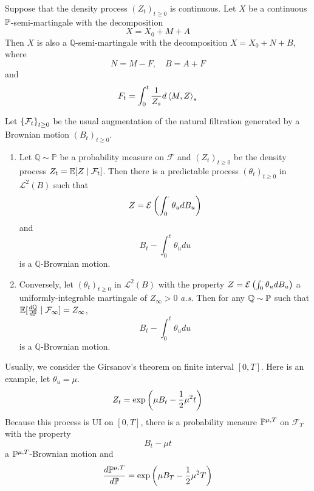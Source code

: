 \documentclass[a4paper,12pt]{article}
\begin{document}
\begin{prop}
  Suppose that the density process $(Z_t)_{t \geq 0}$ is continuous. Let $X$ be a continuous $\mathbb{P}$-semi-martingale with the decomposition
  \begin{equation*}
    X = X_0 + M + A
  \end{equation*}
  Then $X$ is also a $\mathbb{Q}$-semi-martingale with the decomposition $X = X_0 + N +B$, where
  \begin{equation*}
    N = M - F,\quad B = A+F
  \end{equation*}
  and 
  \begin{equation*}
    F_t = \int_0^t \frac{1}{Z_s}d \left\langle M,Z \right\rangle_s
  \end{equation*}
\end{prop}

\begin{thm}[Girsanov]
  Let $\left\{\mathcal{F}_t\right\}_{t \geq 0}$ be the usual augmentation of the natural filtration generated by a Brownian motion $(B_t)_{t \geq 0}$.
  \begin{enumerate}[label = \Roman*.]
    \item Let $\mathbb{Q} \sim \mathbb{P}$ be a probability measure on $\mathcal{F}$ and $(Z_t)_{t \geq 0}$ be the density process $Z_t = \mathbb{E}[Z \mid \mathcal{F}_t]$. Then there is a predictable process $(\theta_t)_{t \geq 0}$ in $\mathcal{L}^2(B)$ such that
    \begin{equation*}
      Z = \mathcal{E}\left(\int_0^{\cdot}\theta_u dB_u\right)
    \end{equation*}
    and
    \begin{equation*}
      B_t - \int_0^t\theta_u du
    \end{equation*}
    is a $\mathbb{Q}$-Brownian motion.

    \item Conversely, let $(\theta_t)_{t \geq 0}$ in $\mathcal{L}^2(B)$ with the property $ Z = \mathcal{E}\left(\int_0^{\cdot}\theta_u dB_u\right)$ a uniformly-integrable martingale of $Z_\infty > 0$ \emph{a.s.} Then for any $\mathbb{Q} \sim \mathbb{P}$ such that $\mathbb{E}[\frac{d\mathbb{Q}}{d\mathbb{P}} \mid \mathcal{F}_\infty] = Z_\infty$,
    \begin{equation*}
      B_t - \int_0^t\theta_u du
    \end{equation*}
    is a $\mathbb{Q}$-Brownian motion.
  \end{enumerate}
\end{thm}
\begin{rmk}
  Usually, we consider the Girsanov's theorem on finite interval $[0,T]$. Here is an example, let $\theta_u = \mu$.
  \begin{equation*}
    Z_t = \exp\left(\mu B_t -\frac{1}{2}\mu^2 t\right)
  \end{equation*}
  Because this process is UI on $[0,T]$, there is a probability measure $\mathbb{P}^{\mu,T}$ on $\mathcal{F}_T$ with the property
  \begin{equation*}
    B_t - \mu t
  \end{equation*}
  a $\mathbb{P}^{\mu,T}$-Brownian motion and
  \begin{equation*}
    \frac{d \mathbb{P}^{\mu,T}}{d \mathbb{P}} = \exp\left(\mu B_T - \frac{1}{2}\mu^2T\right)
  \end{equation*}
\end{rmk}
\end{document}
